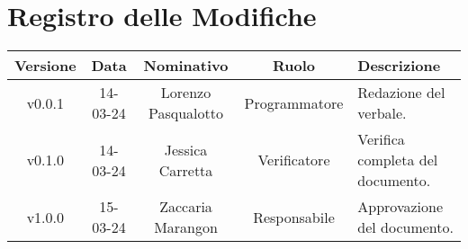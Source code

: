 \section*{\Large Registro delle Modifiche}
    \begin{table}[h]
        \centering
        \renewcommand\tabularxcolumn[1]{m{#1}} %
        \renewcommand{\arraystretch}{1.5}
        \begin{tabularx}{0.98\textwidth}
            {c|c|c|c|>{\centering\arraybackslash}X}
            \rowcolor{black}
            \textbf{\color{white} Versione} & \textbf{\color{white} Data} & \textbf{\color{white} Nominativo} & \textbf{\color{white} Ruolo} & \textbf{\color{white} Descrizione} \\ 
            \hline

            v0.0.1 & 14-03-24 & Lorenzo Pasqualotto & Programmatore & Redazione del verbale.\\
            v0.1.0 & 14-03-24 & Jessica Carretta & Verificatore & Verifica completa del documento.\\
            v1.0.0 & 15-03-24 & Zaccaria Marangon & Responsabile & Approvazione del documento.\\
            \hline
        \end{tabularx}
    \end{table}

